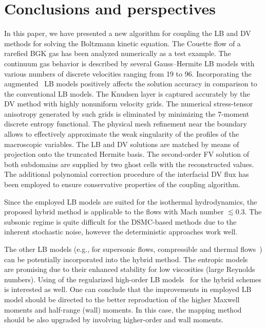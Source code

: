 \documentclass{elsarticle} %
\begin{document}
\section{Conclusions and perspectives}\label{sec:summary}

In this paper, we have presented a new algorithm for coupling the LB and DV methods
for solving the Boltzmann kinetic equation.
The Couette flow of a rarefied BGK gas has been analyzed numerically as a test example.
The continuum gas behavior is described by several Gauss--Hermite LB models
with various numbers of discrete velocities ranging from 19 to 96.
Incorporating the augmented~\cite{Feuchter2016} LB models
positively affects the solution accuracy in comparison to the conventional LB models.
The Knudsen layer is captured accurately by the DV method with highly nonuniform velocity grids.
The numerical stress-tensor anisotropy generated by such grids is eliminated
by minimizing the 7-moment discrete entropy functional.
The physical mesh refinement near the boundary allows to effectively approximate the weak singularity
of the profiles of the macroscopic variables.
The LB and DV solutions are matched by means of projection onto the truncated Hermite basis.
The second-order FV solution of both subdomains are supplied by two ghost cells with the reconstructed values.
The additional polynomial correction procedure of the interfacial DV flux has been employed
to ensure conservative properties of the coupling algorithm.

Since the employed LB models are suited for the isothermal hydrodynamics,
the proposed hybrid method is applicable to the flows with Mach number $\lesssim0.3$.
The subsonic regime is quite difficult for the DSMC-based methods due to the inherent stochastic noise,
however the deterministic approaches work well.

The other LB models (e.g., for supersonic flows, compressible and thermal flows~\cite{Chen2010, Frapolli2015, Frapolli2016})
can be potentially incorporated into the hybrid method.
The entropic models~\cite{Karlin1999, Chikatamarla2006, Chikatamarla2009} are promising
due to their enhanced stability for low viscosities (large Reynolds numbers).
Using of the regularized high-order LB models~\cite{Zhang2006, Mont2015, Mattila2017} for the hybrid schemes is interested as well.
One can conclude that the improvements in employed LB model should be directed
to the better reproduction of the higher Maxwell moments and half-range (wall) moments.
In this case, the mapping method should be also upgraded by involving higher-order and wall moments.
\end{document}
